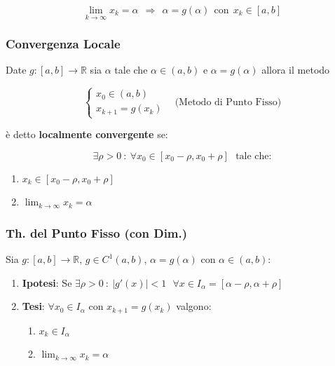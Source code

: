 \documentclass{article}
\begin{document}
\[ \lim_{k \rightarrow \infty} x_{k} = \alpha \:\: \Rightarrow \:\: \alpha = g(\alpha) \:\: \text{con} \:\: x_{k} \in [a,b] \]

\subsubsection{Convergenza Locale}

Date $g:[a,b] \rightarrow \mathbb{R}$ sia $\alpha$ tale che $\alpha \in (a,b)$ e $\alpha = g(\alpha)$ allora il metodo

\[ 
\left\{ \begin{array}{rcl}
    x_{0} \in (a,b) \\
    x_{k+1} = g(x_{k})
    \end{array}\right.
    \:\:\:\: \text{(Metodo di Punto Fisso)} 
\]

è detto \textbf{localmente convergente} se:

\vspace*{-8px}

\[ \exists \rho > 0 \: : \: \forall x_{0} \in [x_{0}-\rho,x_{0}+\rho] \:\:\: \text{tale che:} \]

\begin{enumerate}
    \item $x_{k} \in [x_{0}-\rho,x_{0}+\rho]$
    \item $\lim_{k \rightarrow \infty} x_{k} = \alpha$
\end{enumerate}

\subsubsection{Th. del Punto Fisso (con Dim.)}

Sia $g:[a,b] \rightarrow \mathbb{R}$, $g \in C^{1}(a,b)$, $\alpha = g(\alpha)$ con $\alpha \in (a,b)$:

\begin{enumerate}
    \item \textbf{Ipotesi}: Se $\exists \rho > 0 \: : \: |g'(x)| < 1 \:\:\: \forall x \in I_{\alpha} = [\alpha-\rho,\alpha+\rho]$
    \item \textbf{Tesi}: $\forall x_{0} \in I_{\alpha}$ con $x_{k+1} = g(x_{k})$ valgono:
    \begin{enumerate}
        \item $x_{k} \in I_{\alpha}$
        \item $\lim_{k \rightarrow \infty} x_{k} = \alpha$
    \end{enumerate}
\end{enumerate}
\end{document}
